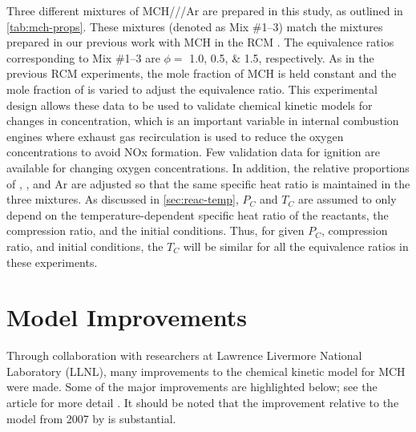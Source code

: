 \documentclass[../main.tex]{subfiles}
\begin{document}
Three different mixtures of MCH///Ar are prepared in this study, as
outlined in \cref{tab:mch-props}. These mixtures (denoted as Mix \#1--3) match the mixtures
prepared in our previous work with MCH in the RCM \cite{Mittal2009}. The equivalence ratios
corresponding to Mix \#1--3 are $\phi=$ \numlist{1.0;0.5;1.5}, respectively.
As in the previous RCM experiments, the mole fraction of MCH is held constant
and the mole fraction of  is varied to adjust the equivalence ratio. This
experimental design allows these data to be used to validate chemical kinetic
models for changes in  concentration, which is an important variable in
internal combustion engines where exhaust gas recirculation is used to reduce
the oxygen concentrations to avoid NOx formation. Few validation data for
ignition are available for changing oxygen concentrations. In addition, the
relative proportions of , , and Ar are adjusted so that the same specific
heat ratio is maintained in the three mixtures. As discussed in \cref{sec:reac-temp},
$P_C$ and $T_C$ are assumed to only depend on the temperature-dependent
specific heat ratio of the reactants, the compression ratio, and the
initial conditions. Thus, for given $P_C$, compression ratio, and
initial conditions, the $T_C$ will be similar for all the equivalence
ratios in these experiments.

\section{Model Improvements}
\label{sec:mch-model-improvements}

Through collaboration with researchers at Lawrence Livermore National
Laboratory (LLNL), many improvements to the chemical kinetic model for MCH were
made. Some of the major improvements are highlighted below; see the article
for more detail \cite{Weber2014}. It should be noted that the improvement relative to the model
from 2007 by \textcite{Pitz2007} is substantial.
\end{document}
